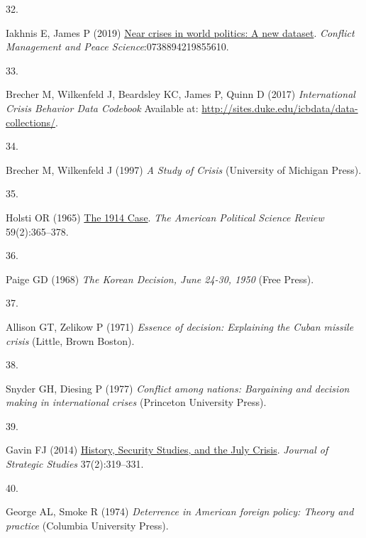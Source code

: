 \documentclass{article}
\newlength{\cslhangindent}
\newlength{\csllabelwidth}
\newlength{\cslentryspacingunit} %
\newenvironment{CSLReferences}[2] %
 {%
  \setlength{\parindent}{0pt}
  \ifodd #1
  \let\oldpar\par
  \def\par{\hangindent=\cslhangindent\oldpar}
  \fi
  \setlength{\parskip}{#2\cslentryspacingunit}
 }%
 {}
\newcommand{\CSLLeftMargin}[1]{\parbox[t]{\csllabelwidth}{#1}}
\newcommand{\CSLRightInline}[1]{\parbox[t]{\linewidth - \csllabelwidth}{#1}\break}
\begin{document}
\begin{CSLReferences}{0}{0}
\leavevmode{}%
\CSLLeftMargin{32. }%
\CSLRightInline{Iakhnis E, James P (2019)
\href{https://doi.org/10.1177/0738894219855610}{Near crises in world
politics: {A} new dataset}. \emph{Conflict Management and Peace
Science}:0738894219855610.}

\leavevmode{}%
\CSLLeftMargin{33. }%
\CSLRightInline{Brecher M, Wilkenfeld J, Beardsley KC, James P, Quinn D
(2017) \emph{International {Crisis Behavior Data Codebook}} Available
at: \url{http://sites.duke.edu/icbdata/data-collections/}.}

\leavevmode{}%
\CSLLeftMargin{34. }%
\CSLRightInline{Brecher M, Wilkenfeld J (1997) \emph{A {Study} of
{Crisis}} ({University of Michigan Press}).}

\leavevmode{}%
\CSLLeftMargin{35. }%
\CSLRightInline{Holsti OR (1965)
\href{https://doi.org/10.2307/1953055}{The 1914 {Case}}. \emph{The
American Political Science Review} 59(2):365--378.}

\leavevmode{}%
\CSLLeftMargin{36. }%
\CSLRightInline{Paige GD (1968) \emph{The {Korean Decision}, {June}
24-30, 1950} ({Free Press}).}

\leavevmode{}%
\CSLLeftMargin{37. }%
\CSLRightInline{Allison GT, Zelikow P (1971) \emph{Essence of decision:
{Explaining} the {Cuban} missile crisis} ({Little, Brown Boston}).}

\leavevmode{}%
\CSLLeftMargin{38. }%
\CSLRightInline{Snyder GH, Diesing P (1977) \emph{Conflict among
nations: {Bargaining} and decision making in international crises}
({Princeton University Press}).}

\leavevmode{}%
\CSLLeftMargin{39. }%
\CSLRightInline{Gavin FJ (2014)
\href{https://doi.org/10.1080/01402390.2014.912916}{History, {Security
Studies}, and the {July Crisis}}. \emph{Journal of Strategic Studies}
37(2):319--331.}

\leavevmode{}%
\CSLLeftMargin{40. }%
\CSLRightInline{George AL, Smoke R (1974) \emph{Deterrence in {American}
foreign policy: {Theory} and practice} ({Columbia University Press}).}


\end{CSLReferences}
\end{document}
